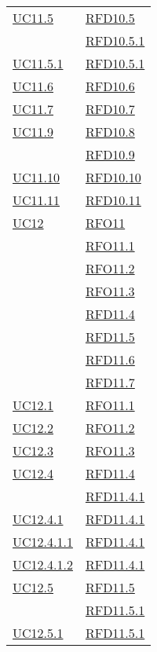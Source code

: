 \begin{longtable}{|>{\centering}m{5cm}|m{5cm}<{\centering}|}
\hyperref[UC11.5]{UC11.5} & \hyperlink{RFD10.5}{RFD10.5}\\
& \hyperlink{RFD10.5.1}{RFD10.5.1}\\ \hline
\hyperref[UC11.5.1]{UC11.5.1} & \hyperlink{RFD10.5.1}{RFD10.5.1}\\ \hline
\hyperref[UC11.6]{UC11.6} & \hyperlink{RFD10.6}{RFD10.6}\\ \hline
\hyperref[UC11.7]{UC11.7} & \hyperlink{RFD10.7}{RFD10.7}\\ \hline
\hyperref[UC11.9]{UC11.9} & \hyperlink{RFD10.8}{RFD10.8}\\
& \hyperlink{RFD10.9}{RFD10.9}\\ \hline
\hyperref[UC11.10]{UC11.10} & \hyperlink{RFD10.10}{RFD10.10}\\ \hline
\hyperref[UC11.11]{UC11.11} & \hyperlink{RFD10.11}{RFD10.11}\\ \hline
\hyperref[UC12]{UC12} & \hyperlink{RFO11}{RFO11}\\
& \hyperlink{RFO11.1}{RFO11.1}\\
& \hyperlink{RFO11.2}{RFO11.2}\\
& \hyperlink{RFO11.3}{RFO11.3}\\
& \hyperlink{RFD11.4}{RFD11.4}\\
& \hyperlink{RFD11.5}{RFD11.5}\\
& \hyperlink{RFD11.6}{RFD11.6}\\
& \hyperlink{RFD11.7}{RFD11.7}\\ \hline
\hyperref[UC12.1]{UC12.1} & \hyperlink{RFO11.1}{RFO11.1}\\ \hline
\hyperref[UC12.2]{UC12.2} & \hyperlink{RFO11.2}{RFO11.2}\\ \hline
\hyperref[UC12.3]{UC12.3} & \hyperlink{RFO11.3}{RFO11.3}\\ \hline
\hyperref[UC12.4]{UC12.4} & \hyperlink{RFD11.4}{RFD11.4}\\
& \hyperlink{RFD11.4.1}{RFD11.4.1}\\ \hline
\hyperref[UC12.4.1]{UC12.4.1} & \hyperlink{RFD11.4.1}{RFD11.4.1}\\ \hline
\hyperref[UC12.4.1.1]{UC12.4.1.1} & \hyperlink{RFD11.4.1}{RFD11.4.1}\\ \hline
\hyperref[UC12.4.1.2]{UC12.4.1.2} & \hyperlink{RFD11.4.1}{RFD11.4.1}\\ \hline
\hyperref[UC12.5]{UC12.5} & \hyperlink{RFD11.5}{RFD11.5}\\
& \hyperlink{RFD11.5.1}{RFD11.5.1}\\ \hline
\hyperref[UC12.5.1]{UC12.5.1} & \hyperlink{RFD11.5.1}{RFD11.5.1}\\ \hline

\end{longtable}
